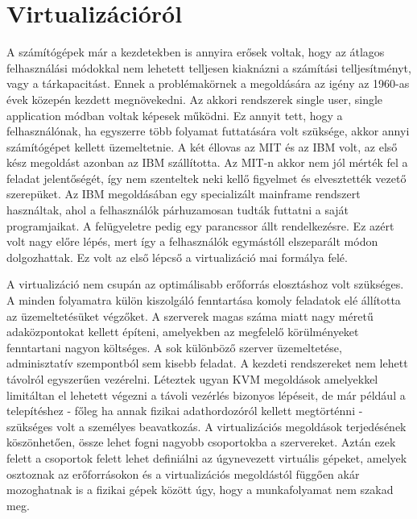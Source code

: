 \documentclass[12pt,oneside,justify]{book}
\begin{document}
 




\tableofcontents

\chapter{Virtualizációról}

A számítógépek már a kezdetekben is annyira erősek voltak, hogy az átlagos felhasználási módokkal nem lehetett telljesen kiaknázni a számítási telljesítményt, vagy a tárkapacitást.
Ennek a problémakörnek a megoldására az igény az 1960-as évek közepén kezdett megnövekedni. 
Az akkori rendszerek single user, single application módban voltak képesek működni. 
Ez annyit tett, hogy a felhasználónak, ha egyszerre több folyamat futtatására volt szüksége, akkor annyi számítógépet kellett üzemeltetnie. 
A két éllovas az MIT és az IBM volt, az első kész megoldást azonban az IBM szállította. 
Az MIT-n akkor nem jól mérték fel a feladat jelentőségét, így nem szenteltek neki kellő figyelmet és elvesztették vezető szerepüket. 
Az IBM megoldásában egy specializált mainframe rendszert használtak, ahol a felhasználók párhuzamosan tudták futtatni a saját programjaikat.
A felügyeletre pedig egy parancssor állt rendelkezésre.
Ez azért volt nagy előre lépés, mert így a felhasználók egymástóll elszeparált módon dolgozhattak.
Ez volt az első lépcső a virtualizáció mai formálya felé.

A virtualizáció nem csupán az optimálisabb erőforrás elosztáshoz volt szükséges. 
A minden folyamatra külön kiszolgáló fenntartása komoly feladatok elé állította az üzemeltetésüket végzőket. 
A szerverek magas száma miatt nagy méretű adaközpontokat kellett építeni, amelyekben az megfelelő körülményeket fenntartani nagyon költséges. 
A sok különböző szerver üzemeltetése, adminisztatív szempontból sem kisebb feladat. 
A kezdeti rendszereket nem lehett távolról egyszerűen vezérelni. Léteztek ugyan KVM megoldások amelyekkel limitáltan el lehetett végezni a távoli vezérlés bizonyos lépéseit, de már például a telepítéshez - főleg ha annak fizikai adathordozóról kellett megtörténni - szükséges volt a személyes beavatkozás. 
A virtualizációs megoldások terjedésének köszönhetően, össze lehet fogni nagyobb csoportokba a szervereket. 
Aztán ezek felett a csoportok felett lehet definiálni az úgynevezett virtuális gépeket, amelyek osztoznak az erőforrásokon és a virtualizációs megoldástól függően akár mozoghatnak is a fizikai gépek között úgy, hogy a munkafolyamat nem szakad meg.
\end{document}
